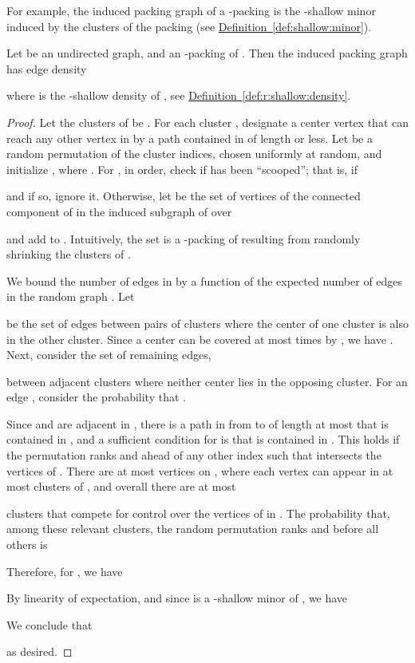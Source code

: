 \documentclass[12pt]{article}
\theoremstyle{remark}\theoremheaderfont{\sf}\theorembodyfont{\upshape}
\numberwithin{figure}{section}\numberwithin{table}{section}\numberwithin{equation}{section}
\newcommand{\HLink}[2]{\hyperref[#2]{#1~\ref*{#2}}}
\newcommand{\defref}[1]{\HLink{Definition}{def:#1}}
\newcommand{\lemlab}[1]{\label{lemma:#1}}
\begin{document}
For example, the induced packing graph of a -packing is the
-shallow minor induced by the clusters of the packing (see
\defref{shallow:minor}).




\begin{lemma}
  \lemlab{edge-density-shallow-cover}Let  be an undirected graph, and  an
  -packing of . Then the induced packing graph
   has edge density
  
  where  is the -shallow density of ,
  see \defref{r:shallow:density}.
\end{lemma}
\begin{proof}
  Let the clusters of  be
  . For each cluster
  , designate a center vertex
   that can reach any other vertex in
   by a path contained in  of length 
  or less.  Let  be a random
  permutation of the cluster indices, chosen uniformly at random, and
  initialize , where
  .  For , in order,
  check if  has been ``scooped''; that is, if
  
  and if so, ignore it. Otherwise, let  be the set of
  vertices of the connected component of  in the induced
  subgraph of  over
  
  and add  to .  Intuitively, the set  is a
  -packing of  resulting from randomly shrinking the
  clusters of .


  \smallskip We bound the number of edges in
   by a function of the
  expected number of edges in the random graph
  .  Let
  
  be the set of edges between pairs of clusters where the center of
  one cluster is also in the other cluster. Since a center 
  can be covered at most  times by , we have
  .  Next, consider
  the set of remaining edges,
  
  between adjacent clusters where neither center lies in the opposing
  cluster. For an edge , consider
  the probability that .

  Since  and  are adjacent in ,
  there is a path  in  from  to  of
  length at most  that is contained in
  , and a sufficient condition for
   is that  is contained in
  . This holds if the permutation 
  ranks  and  ahead of any other index  such that
   intersects the vertices of . There are at most
   vertices on , where each vertex can appear in at most
   clusters of , and overall there are at most
  
  clusters that compete for control over the vertices of  in
  . The probability that, among these relevant clusters, the
  random permutation  ranks  and  before all others is
  
  Therefore, for , we have
  
  By linearity of expectation, and since
   is a -shallow minor of
  , we have
  
  We conclude that
  
  as desired.
\end{proof}
\end{document}
